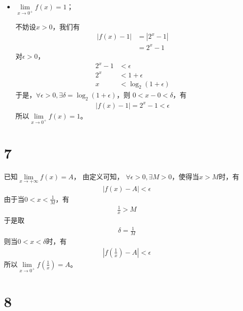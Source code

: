 \documentclass{article}
\begin{document}
\begin{itemize}
\begin{itemize}
          \item $\lim\limits_{x \to 0^{+}} f(x) = 1$；

                不妨设$x > 0$，我们有
                \begin{align*}
                  |f(x) - 1|
                   & = |2^x - 1| \\
                   & = 2^x - 1
                \end{align*}
                对$\epsilon > 0$，
                \begin{align*}
                  2^x - 1 & < \epsilon             \\
                  2^x     & < 1 + \epsilon         \\
                  x       & < \log_2(1 + \epsilon)
                \end{align*}
                于是，$\forall \epsilon > 0, \exists \delta = \log_2(1 + \epsilon)$，则
                $0 < x - 0 < \delta$，有
                \begin{align*}
                  |f(x) - 1| =  2^x - 1 < \epsilon
                \end{align*}
                所以$\lim\limits_{x \to 0^{+}} f(x) = 1$。
        \end{itemize}

\end{itemize}

\section*{7}

已知$\lim\limits_{x \to +\infty} f(x) = A$，
由定义可知，
$\forall \epsilon > 0, \exists M > 0$，使得当$x > M$时，有
\begin{align*}
  |f(x) - A| < \epsilon
\end{align*}
由于当$0 < x < \frac{1}{M}$，有
\begin{align*}
  \frac{1}{x} > M
\end{align*}
于是取
\begin{align*}
  \delta = \frac{1}{M}
\end{align*}
则当$0 < x < \delta$时，有
\begin{align*}
  |f(\frac{1}{x}) - A| < \epsilon
\end{align*}
所以$\lim\limits_{x \to 0^+} f(\frac{1}{x}) = A$。

\section*{8}
\end{document}
